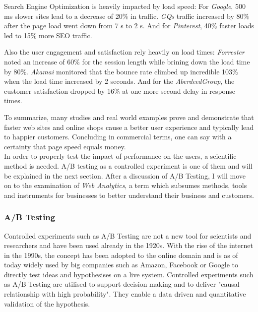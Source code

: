 Search Engine Optimization is heavily impacted by load speed:
For \textit{Google}, 500 ms slower sites lead to a decrease of 20\% in traffic.
\textit{GQs} traffic increased by 80\% after the page load went down from 7 s to 2 s.
And for \textit{Pinterest}, 40\% faster loads led to 15\% more SEO traffic.



Also the user engagement and satisfaction rely heavily on load times:  \textit{Forrester} noted an increase of 60\% for the session length while brining down the load time by 80\%.
\textit{Akamai} monitored that the bounce rate climbed up incredible 103\% when the load time increased by 2 seconds.
And for the \textit{AberdeedGroup}, the customer satisfaction dropped by 16\% at one more second delay in response times.



To summarize, many studies and real world examples prove and demonstrate that faster web sites and online shops cause a better user experience and typically lead to happier customers. 
Concluding in commercial terms, one can say with a certainty that page speed equals money.
\\

In order to properly test the impact of performance on the users, a scientific method is needed.
A/B testing as a controlled experiment is one of them and will be explained in the next section.
After a discussion of A/B Testing, I will move on to the examination of \textit{Web Analytics}, a term which subsumes methods, tools and instruments for businesses to better understand their business and customers.


\subsubsection{A/B Testing}



Controlled experiments such as A/B Testing are not a new tool for scientists and researchers and have been used already in the 1920s. %
With the rise of the internet in the 1990s, the concept has been adopted to the online domain and is as of today widely used by big companies such as Amazon, Facebook or Google to directly test ideas and hypothesises on a live system.
Controlled experiments such as A/B Testing are utilised to support decision making and to deliver "causal relationship with high probability". %
They enable a data driven and quantitative validation of the hypothesis. %

